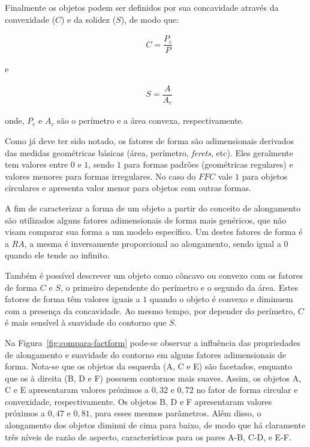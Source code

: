 Finalmente os objetos podem ser definidos por sua concavidade através
da convexidade ($C$) e da solidez ($S$), de modo que:

\begin{align}
 &C=\dfrac{P_{c}}{P}\label{eq-conv}
\end{align} 

e

\begin{align}
 &S=\dfrac{A}{A_{c}}\label{eq-sol}
\end{align} 

onde, $P_{c}$ e $A_{c}$ são o perímetro e a área convexa, respectivamente.

Como já deve ter sido notado, os fatores de forma são adimensionais
derivados das medidas geométricas básicas (área, perímetro,
\textit{ferets}, etc). Eles geralmente tem valores entre $0$ e $1$,
sendo $1$ para formas padrões (geométricas regulares) e valores
menores para formas irregulares. No caso do $FFC$ vale $1$ para
objetos circulares e apresenta valor menor para objetos com outras
formas.

A fim de caracterizar a forma de um objeto a partir do conceito de
alongamento são utilizados alguns fatores adimensionais de forma mais
genéricos, que não visam comparar sua forma a um modelo específico. Um
destes fatores de forma é a $RA$, a mesma é inversamente proporcional
ao alongamento, sendo igual a $0$ quando ele tende ao infinito.

Também é possível descrever um objeto como côncavo ou convexo com os
fatores de forma $C$ e $S$, o primeiro dependente do perímetro e o
segundo da área. Estes fatores de forma têm valores iguais a $1$
quando o objeto é convexo e diminuem com a presença da concavidade. Ao
mesmo tempo, por depender do perímetro, $C$ é mais sensível à
suavidade do contorno que $S$.

Na Figura~\ref{fig:compara-factform} pode-se observar a influência das
propriedades de alongamento e suavidade do contorno em alguns fatores
adimensionais de forma.\cite{114} Nota-se que os objetos da esquerda
(A, C e E) são facetados, enquanto que os à direita (B, D e F) possuem
contornos mais suaves. Assim, os objetos A, C e E apresentaram valores
próximos a $0,32$ e $0,72$ no fator de forma circular e convexidade,
respectivamente. Os objetos B, D e F apresentaram valores próximos a
$0,47$ e $0,81$, para esses mesmos parâmetros. Além disso, o
alongamento dos objetos diminui de cima para baixo, de modo que há
claramente três níveis de razão de aspecto, característicos para os
pares A-B, C-D, e E-F.\cite{72,114}

